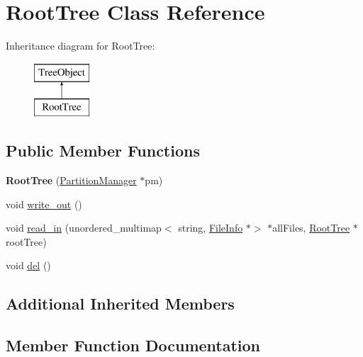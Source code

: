 \hypertarget{classRootTree}{}\section{Root\+Tree Class Reference}
\label{classRootTree}
Inheritance diagram for Root\+Tree\+:\begin{figure}[H]
\begin{center}
\leavevmode
\includegraphics[height=2.000000cm]{classRootTree}
\end{center}
\end{figure}
\subsection*{Public Member Functions}
\begin{DoxyCompactItemize}
\item 
\mbox{\label{classRootTree_a491c0374c9024faf1e1c8045f21a4cad}} 
{\bfseries Root\+Tree} (\mbox{\hyperlink{classPartitionManager}{Partition\+Manager}} $\ast$pm)
\item 
void \mbox{\hyperlink{classRootTree_ad6eefe5d46ee37b3725799897a78c2dd}{write\+\_\+out}} ()
\item 
void \mbox{\hyperlink{classRootTree_a658eed78be67e890de2283af960dc532}{read\+\_\+in}} (unordered\+\_\+multimap$<$ string, \mbox{\hyperlink{classFileInfo}{File\+Info}} $\ast$$>$ $\ast$all\+Files, \mbox{\hyperlink{classRootTree}{Root\+Tree}} $\ast$root\+Tree)
\item 
void \mbox{\hyperlink{classRootTree_ac431dc04b767fc66791c251d8173650d}{del}} ()
\end{DoxyCompactItemize}
\subsection*{Additional Inherited Members}


\subsection{Member Function Documentation}
\mbox{\label{classRootTree_ac431dc04b767fc66791c251d8173650d}} 
